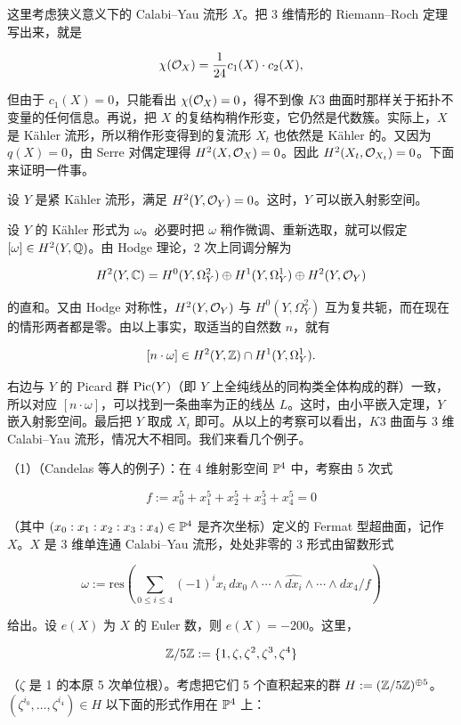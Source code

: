 这里考虑狭义意义下的 Calabi--Yau 流形 $X$。把 3 维情形的 Riemann--Roch 定理写出来，就是

\[
  \chi(\mathcal{O}_X) = \frac{1}{24}c_1(X)\cdot c_2(X),
\]

但由于 $c_1(X) = 0$，只能看出 $\chi(\mathcal{O}_X) = 0$，得不到像 $K3$ 曲面时那样关于拓扑不变量的任何信息。再说，把 $X$ 的复结构稍作形变，它仍然是代数簇。实际上，$X$ 是 Kähler 流形，所以稍作形变得到的复流形 $X_t$ 也依然是 Kähler 的。又因为 $q(X) = 0$，由 Serre 对偶定理得 $H^2(X,\mathcal{O}_X) = 0$。因此 $H^2(X_t,\mathcal{O}_{X_t}) = 0$。下面来证明一件事。

设 $Y$ 是紧 Kähler 流形，满足 $H^2(Y,\mathcal{O}_Y) = 0$。这时，$Y$ 可以嵌入射影空间。

设 $Y$ 的 Kähler 形式为 $\omega$。必要时把 $\omega$ 稍作微调、重新选取，就可以假定 $[\omega] \in H^2(Y,\mathbb{Q})$。由 Hodge 理论，2 次上同调分解为

\[
  H^2(Y,\mathbb{C}) = H^0(Y,\Omega^2_Y) \oplus H^1(Y,\Omega^1_Y) \oplus H^2(Y,\mathcal{O}_Y)
\]

的直和。又由 Hodge 对称性，$H^2(Y,\mathcal{O}_Y)$ 与 $H^0(Y,\Omega^2_Y)$ 互为复共轭，而在现在的情形两者都是零。由以上事实，取适当的自然数 $n$，就有

\[
  [n\cdot\omega] \in H^2(Y,\mathbb{Z}) \cap H^1(Y,\Omega^1_Y) .
\]

右边与 $Y$ 的 Picard 群 $\operatorname{Pic}(Y)$（即 $Y$ 上全纯线丛的同构类全体构成的群）一致，所以对应 $[n\cdot\omega]$，可以找到一条曲率为正的线丛 $L$。这时，由小平嵌入定理，$Y$ 嵌入射影空间。最后把 $Y$ 取成 $X_t$ 即可。从以上的考察可以看出，$K3$ 曲面与 3 维 Calabi--Yau 流形，情况大不相同。我们来看几个例子。

（1）（Candelas 等人的例子）：在 4 维射影空间 $\mathbb{P}^4$ 中，考察由 5 次式

\[
  f := x_0^5 + x_1^5 + x_2^5 + x_3^5 + x_4^5 = 0
\]

（其中 $(x_0:x_1:x_2:x_3:x_4) \in \mathbb{P}^4$ 是齐次坐标）定义的 Fermat 型超曲面，记作 $X$。$X$ 是 3 维单连通 Calabi--Yau 流形，处处非零的 3 形式由留数形式

\[
  \omega := \mathrm{res}\left(\sum_{0\le i\le 4}(-1)^i x_i\,
  dx_0\wedge\cdots\wedge\widehat{dx_i}\wedge\cdots\wedge dx_4 \big/ f\right)
\]

给出。设 $e(X)$ 为 $X$ 的 Euler 数，则 $e(X) = -200$。这里，

\[
  \mathbb{Z}/5\mathbb{Z} := \{1,\zeta,\zeta^2,\zeta^3,\zeta^4\}
\]

（$\zeta$ 是 1 的本原 5 次单位根）。考虑把它们 5 个直积起来的群 $H := (\mathbb{Z}/5\mathbb{Z})^{\oplus 5}$。$(\zeta^{i_0},\dots,\zeta^{i_4}) \in H$ 以下面的形式作用在 $\mathbb{P}^4$ 上：

